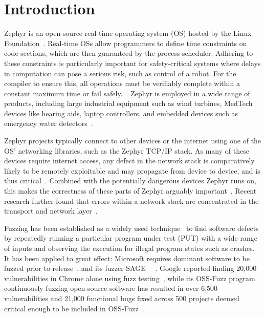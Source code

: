 \documentclass[twocolumn]{article}
\let\savedCite=\cite
\renewcommand{\cite}{\unskip~\savedCite}
\begin{document}
\clearpage\newpage


\tableofcontents
\clearpage\newpage
\twocolumn
{}


\section{Introduction}
\label{Introduction}

Zephyr is an open-source real-time operating system (OS) hosted by the Linux Foundation\cite{ZephyrAbout}. Real-time OSs allow programmers to define time constraints on code sections, which are then guaranteed by the process scheduler. Adhering to these constraints is particularly important for safety-critical systems where delays in computation can pose a serious risk, such as control of a robot. For the compiler to ensure this, all operations must be verifiably complete within a constant maximum time or fail safely.\cite{RTOSWiki}. Zephyr is employed in a wide range of products, including large industrial equipment such as wind turbines, MedTech devices like hearing aids, laptop controllers, and embedded devices such as emergency water detectors\cite{ZephyrUsedIn}.

Zephyr projects typically connect to other devices or the internet using one of the OS' networking libraries, such as the Zephyr TCP/IP stack. As many of these devices require internet access, any defect in the network stack is comparatively likely to be remotely exploitable and may propagate from device to device, and is thus critical\cite{Fuzzware}. Combined with the potentially dangerous devices Zephyr runs on, this makes the correctness of these parts of Zephyr arguably important\cite{Tardis}. Recent research further found that errors within a network stack are concentrated in the transport and network layer\cite{NetworkBugsReview}.

Fuzzing has been established as a widely used technique\cite{Demystifying} to find software defects by repeatedly running a particular program under test (PUT) with a wide range of inputs and observing the execution for illegal program states such as crashes. It has been applied to great effect: Microsoft requires dominant software to be fuzzed prior to release\cite{Demystifying}, and its fuzzer SAGE\cite{SAGE} \cite{FuzzingTheStateOfTheArt}. Google reported finding 20,000 vulnerabilities in Chrome alone using fuzz testing\cite{Demystifying}, while its OSS-Fuzz program continuously fuzzing open-source software has resulted in over 6,500 vulnerabilities and 21,000 functional bugs fixed across 500 projects deemed critical enough to be included in OSS-Fuzz\cite{ClusterFuzzLite}.
\end{document}
